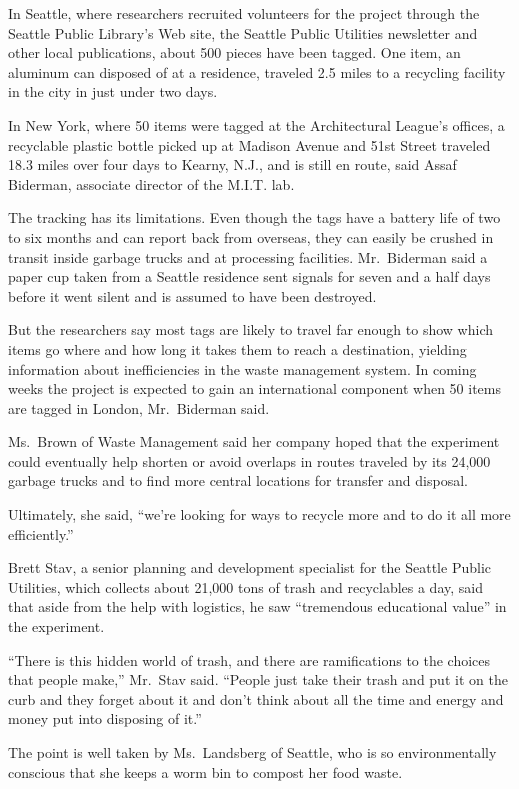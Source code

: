 ﻿\documentclass[12pt]{article}
\begin{document}
In Seattle, where researchers recruited volunteers for the project through the Seattle Public
Library's Web site, the Seattle Public Utilities newsletter and other local publications, about 500
pieces have been tagged. One item, an aluminum can disposed of at a residence, traveled 2.5 miles to
a recycling facility in the city in just under two days.

In New York, where 50 items were tagged at the Architectural League's offices, a recyclable plastic
bottle picked up at Madison Avenue and 51st Street traveled 18.3 miles over four days to Kearny,
N.J., and is still en route, said Assaf Biderman, associate director of the M.I.T. lab.

The tracking has its limitations. Even though the tags have a battery life of two to six months and
can report back from overseas, they can easily be crushed in transit inside garbage trucks and at
processing facilities. Mr.~Biderman said a paper cup taken from a Seattle residence sent signals for
seven and a half days before it went silent and is assumed to have been destroyed.

But the researchers say most tags are likely to travel far enough to show which items go where and
how long it takes them to reach a destination, yielding information about inefficiencies in the
waste management system. In coming weeks the project is expected to gain an international component
when 50 items are tagged in London, Mr.~Biderman said.

Ms.~Brown of Waste Management said her company hoped that the experiment could eventually help
shorten or avoid overlaps in routes traveled by its 24,000 garbage trucks and to find more central
locations for transfer and disposal.

Ultimately, she said, ``we're looking for ways to recycle more and to do it all more efficiently.''

Brett Stav, a senior planning and development specialist for the Seattle Public Utilities, which
collects about 21,000 tons of trash and recyclables a day, said that aside from the help with
logistics, he saw ``tremendous educational value'' in the experiment.

``There is this hidden world of trash, and there are ramifications to the choices that people
make,'' Mr.~Stav said. ``People just take their trash and put it on the curb and they forget about
it and don't think about all the time and energy and money put into disposing of it.''

The point is well taken by Ms.~Landsberg of Seattle, who is so environmentally conscious that she
keeps a worm bin to compost her food waste.
\end{document}

